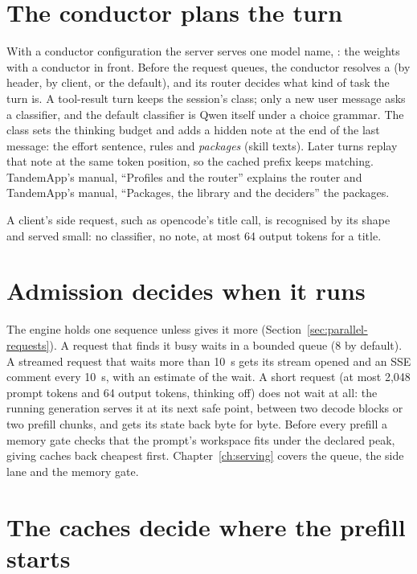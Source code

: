 \section{The conductor plans the turn}

With a conductor configuration the server serves one model name, : the weights with a conductor in front. Before the request queues, the conductor resolves a  (by header, by client, or the default), and its router decides what kind of task the turn is. A tool-result turn keeps the session's class; only a new user message asks a classifier, and the default classifier is Qwen itself under a choice grammar. The class sets the thinking budget and adds a hidden note at the end of the last message: the effort sentence, rules and \emph{packages} (skill texts). Later turns replay that note at the same token position, so the cached prefix keeps matching. TandemApp's manual, \enquote{Profiles and the router} explains the router and TandemApp's manual, \enquote{Packages, the library and the deciders} the packages.

A client's side request, such as opencode's title call, is recognised by its shape and served small: no classifier, no note, at most 64 output tokens for a title.

\section{Admission decides when it runs}

The engine holds one sequence unless  gives it more (Section~\ref{sec:parallel-requests}). A request that finds it busy waits in a bounded queue (8 by default). A streamed request that waits more than 10~s gets its stream opened and an SSE comment every 10~s, with an estimate of the wait. A short request (at most 2,048 prompt tokens and 64 output tokens, thinking off) does not wait at all: the running generation serves it at its next safe point, between two decode blocks or two prefill chunks, and gets its state back byte for byte. Before every prefill a memory gate checks that the prompt's workspace fits under the declared peak, giving caches back cheapest first. Chapter~\ref{ch:serving} covers the queue, the side lane and the memory gate.

\section{The caches decide where the prefill starts}

